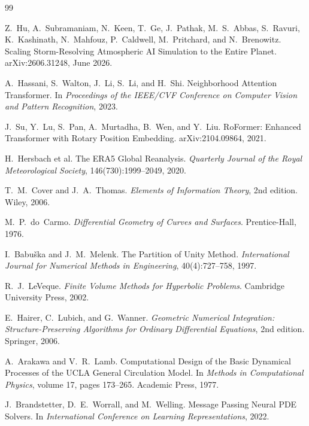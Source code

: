 \documentclass[11pt]{article}
\theoremstyle{definition}
\theoremstyle{remark}
\begin{document}
\begin{thebibliography}{99}

Z.~Hu, A.~Subramaniam, N.~Keen, T.~Ge, J.~Pathak, M.~S.~Abbas, S.~Ravuri, K.~Kashinath, N.~Mahfouz, P.~Caldwell, M.~Pritchard, and N.~Brenowitz.
\newblock Scaling Storm-Resolving Atmospheric AI Simulation to the Entire Planet.
\newblock arXiv:2606.31248, June 2026.

A.~Hassani, S.~Walton, J.~Li, S.~Li, and H.~Shi.
\newblock Neighborhood Attention Transformer.
\newblock In \emph{Proceedings of the IEEE/CVF Conference on Computer Vision and Pattern Recognition}, 2023.

J.~Su, Y.~Lu, S.~Pan, A.~Murtadha, B.~Wen, and Y.~Liu.
\newblock RoFormer: Enhanced Transformer with Rotary Position Embedding.
\newblock arXiv:2104.09864, 2021.

H.~Hersbach et al.
\newblock The ERA5 Global Reanalysis.
\newblock \emph{Quarterly Journal of the Royal Meteorological Society}, 146(730):1999--2049, 2020.

T.~M.~Cover and J.~A.~Thomas.
\newblock \emph{Elements of Information Theory}, 2nd edition.
\newblock Wiley, 2006.

M.~P.~do~Carmo.
\newblock \emph{Differential Geometry of Curves and Surfaces}.
\newblock Prentice-Hall, 1976.

I.~Babu\v{s}ka and J.~M.~Melenk.
\newblock The Partition of Unity Method.
\newblock \emph{International Journal for Numerical Methods in Engineering}, 40(4):727--758, 1997.

R.~J.~LeVeque.
\newblock \emph{Finite Volume Methods for Hyperbolic Problems}.
\newblock Cambridge University Press, 2002.

E.~Hairer, C.~Lubich, and G.~Wanner.
\newblock \emph{Geometric Numerical Integration: Structure-Preserving Algorithms for Ordinary Differential Equations}, 2nd edition.
\newblock Springer, 2006.

A.~Arakawa and V.~R.~Lamb.
\newblock Computational Design of the Basic Dynamical Processes of the UCLA General Circulation Model.
\newblock In \emph{Methods in Computational Physics}, volume 17, pages 173--265. Academic Press, 1977.

J.~Brandstetter, D.~E.~Worrall, and M.~Welling.
\newblock Message Passing Neural PDE Solvers.
\newblock In \emph{International Conference on Learning Representations}, 2022.

\end{thebibliography}
\end{document}
